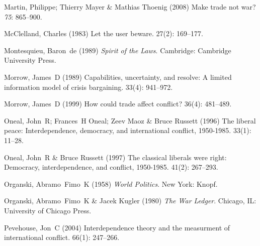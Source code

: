 \documentclass[12pt]{article}
\theoremstyle{hypothesis}
\begin{document}
\begin{thebibliography}{}
Martin, Philippe; Thierry Mayer  \& Mathias Thoenig (2008) Make trade not war?
 {\em 75}: 865--900.

McClelland, Charles (1983) Let the user beware.
 { 27\/}(2): 169--177.

Montesquieu, Baron~de (1989) {\em Spirit of the Laws}.
\newblock Cambridge: Cambridge University Press.

Morrow, James~D (1989) Capabilities, uncertainty, and resolve: A limited
  information model of crisis bargaining.
 { 33\/}(4): 941--972.

Morrow, James~D (1999) How could trade affect conflict?
 { 36\/}(4): 481--489.

Oneal, John~R; Frances~H Oneal; Zeev Maoz  \& Bruce Russett (1996) The liberal
  peace: Interdependence, democracy, and international conflict, 1950-1985.
 { 33\/}(1): 11--28.

Oneal, John~R  \& Bruce Russett (1997) The classical liberals were right:
  Democracy, interdependence, and conflict, 1950-1985.
 { 41\/}(2): 267--293.

Organski, Abramo~Fimo~K (1958) {\em World Politics}.
\newblock New York: Knopf.

Organski, Abramo~Fimo~K  \& Jacek Kugler (1980) {\em The War Ledger}.
\newblock Chicago, IL: University of Chicago Press.

Pevehouse, Jon~C (2004) Interdependence theory and the measurment of
  international conflict.
 { 66\/}(1): 247--266.


\end{thebibliography}
\end{document}
